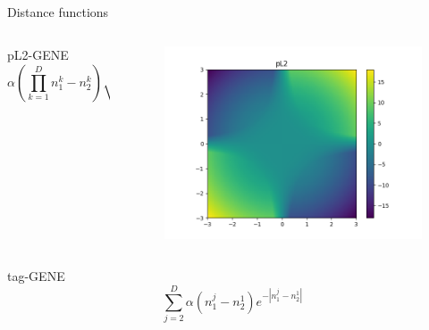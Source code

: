 \begin{frame}{\tciii{} Distance functions}

\begin{columns}
\begin{column}{0.60\linewidth}
\begin{block}{pL2-GENE}
\begin{equation}
\alpha \left  ( \prod_{k=1}^D n_1^k - n_2^k \right ) \sqrt{\sum_{j=1}^D \left( n_1^j - n_2^j \right)^2 }
\end{equation}
\end{block}
\end{column}

\begin{column}{0.35\linewidth}
\begin{figure}
\centering
\includegraphics[width=\linewidth]{images/GENE/images/distance_pL2.png}
\end{figure}
\end{column}
\end{columns}

\begin{columns}
\begin{column}{0.60\linewidth}
\begin{block}{tag-GENE}
\begin{equation}
\sum_{j=2}^D \alpha(n_1^j - n_2^1) e^{-|n_1^j - n_2^1|}
\end{equation}
\end{block}
\end{column}


\end{columns}
\end{frame}
